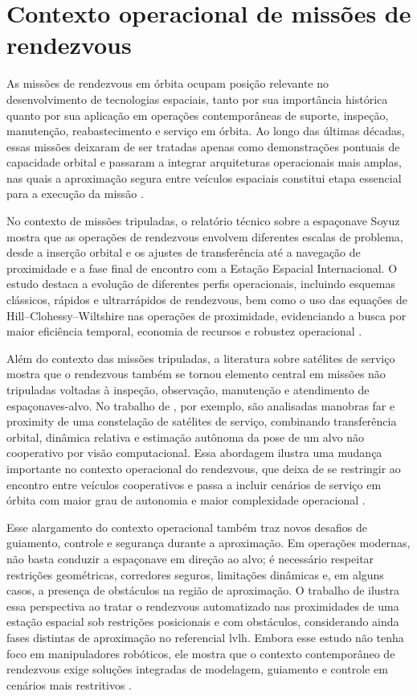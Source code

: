 \section{Contexto operacional de missões de rendezvous}

As missões de rendezvous em órbita ocupam posição relevante no desenvolvimento de tecnologias espaciais, tanto por sua importância histórica quanto por sua aplicação em operações contemporâneas de suporte, inspeção, manutenção, reabastecimento e serviço em órbita. Ao longo das últimas décadas, essas missões deixaram de ser tratadas apenas como demonstrações pontuais de capacidade orbital e passaram a integrar arquiteturas operacionais mais amplas, nas quais a aproximação segura entre veículos espaciais constitui etapa essencial para a execução da missão \cite{arantes2010far,technicalreportsoyuz}.

No contexto de missões tripuladas, o relatório técnico sobre a espaçonave Soyuz mostra que as operações de rendezvous envolvem diferentes escalas de problema, desde a inserção orbital e os ajustes de transferência até a navegação de proximidade e a fase final de encontro com a Estação Espacial Internacional. O estudo destaca a evolução de diferentes perfis operacionais, incluindo esquemas clássicos, rápidos e ultrarrápidos de rendezvous, bem como o uso das equações de Hill--Clohessy--Wiltshire nas operações de proximidade, evidenciando a busca por maior eficiência temporal, economia de recursos e robustez operacional \cite{technicalreportsoyuz}.

Além do contexto das missões tripuladas, a literatura sobre satélites de serviço mostra que o rendezvous também se tornou elemento central em missões não tripuladas voltadas à inspeção, observação, manutenção e atendimento de espaçonaves-alvo. No trabalho de \cite{arantes2010far}, por exemplo, são analisadas manobras far e proximity de uma constelação de satélites de serviço, combinando transferência orbital, dinâmica relativa e estimação autônoma da pose de um alvo não cooperativo por visão computacional. Essa abordagem ilustra uma mudança importante no contexto operacional do rendezvous, que deixa de se restringir ao encontro entre veículos cooperativos e passa a incluir cenários de serviço em órbita com maior grau de autonomia e maior complexidade operacional \cite{arantes2010far}.

Esse alargamento do contexto operacional também traz novos desafios de guiamento, controle e segurança durante a aproximação. Em operações modernas, não basta conduzir a espaçonave em direção ao alvo; é necessário respeitar restrições geométricas, corredores seguros, limitações dinâmicas e, em alguns casos, a presença de obstáculos na região de aproximação. O trabalho de \cite{fiori2024modeling} ilustra essa perspectiva ao tratar o rendezvous automatizado nas proximidades de uma estação espacial sob restrições posicionais e com obstáculos, considerando ainda fases distintas de aproximação no referencial \gls{lvlh}. Embora esse estudo não tenha foco em manipuladores robóticos, ele mostra que o contexto contemporâneo de rendezvous exige soluções integradas de modelagem, guiamento e controle em cenários mais restritivos \cite{fiori2024modeling}.

